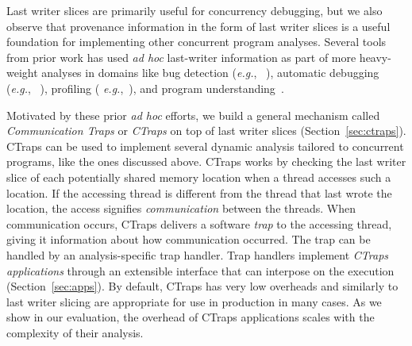 \documentclass[preprint,9pt]{sigplanconf}
\newcommand{\ctraps}{CTraps\xspace}
\begin{document}
Last writer slices are primarily useful for concurrency debugging, but we also
observe that provenance information in the form of last writer slices is a
useful foundation for implementing other concurrent program analyses.  Several
tools from prior work has used {\em ad hoc} last-writer information as part of
more heavy-weight analyses in domains like bug detection ({\em e.g.},
~\cite{dmtracker,avio}), automatic debugging ({\em e.g.},
~\cite{recon,conseq,cci}), profiling ({\em
e.g.},~\cite{threadclustering, schedpredictionmodel}), and program
understanding~\cite{oshatr}. 

Motivated by these prior {\em ad hoc} efforts, we build a general mechanism
called {\em Communication Traps} or {\em \ctraps} on top of last writer slices
(Section~\ref{sec:ctraps}). \ctraps can be used to implement several dynamic
analysis tailored to concurrent programs, like the ones discussed above.
\ctraps works by checking the last writer slice of each potentially shared
memory location when a thread accesses such a location. If the accessing
thread is different from the thread that last wrote the location, the access
signifies {\em communication} between the threads. When communication occurs,
\ctraps delivers a software {\em trap} to the accessing thread, giving it
information about how communication occurred. The trap can be handled by an
analysis-specific trap handler. Trap handlers implement {\em \ctraps
applications} through an extensible interface that can interpose on the
execution (Section~\ref{sec:apps}). By default, \ctraps has very low overheads
and similarly to last writer slicing are appropriate for use in production in
many cases. 
As we show in our evaluation, the
overhead of \ctraps applications scales with the complexity of their analysis.



%
\end{document}
